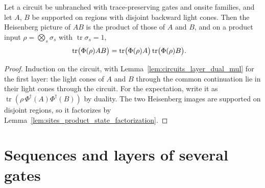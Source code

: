 \begin{theorem}
    \label{thm:circuits_light_cone_factorization}
    \leanok
    Let a circuit be unbranched with trace-preserving gates and onsite families, and let
    $A$, $B$ be supported on regions with disjoint backward light cones. Then the
    Heisenberg picture of $AB$ is the product of those of $A$ and $B$, and on a product
    input $\rho=\bigotimes_s\sigma_s$ with $\operatorname{tr}\sigma_s=1$,
    \begin{align}
        \operatorname{tr}\bigl(\Phi(\rho)AB\bigr)
        &=\operatorname{tr}\bigl(\Phi(\rho)A\bigr)\operatorname{tr}\bigl(\Phi(\rho)B\bigr).
        \notag
    \end{align}
\end{theorem}
\begin{proof}\leanok
    Induction on the circuit, with Lemma~\ref{lem:circuits_layer_dual_mul} for the first
    layer: the light cones of $A$ and $B$ through the common continuation lie in their
    light cones through the circuit. For the expectation, write it as
    $\operatorname{tr}(\rho\,\Phi^\dagger(A)\Phi^\dagger(B))$ by duality. The two
    Heisenberg images are supported on disjoint regions, so it factorizes by
    Lemma~\ref{lem:sites_product_state_factorization}.
\end{proof}

\section{Sequences and layers of several gates}
\label{sec:circuits_sequences}

